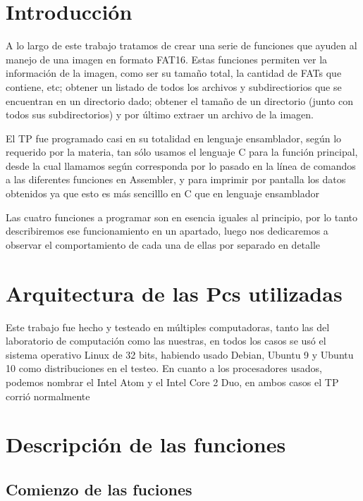 \documentclass[a4paper,10pt]{article}
\title{}
\author{}
\date{}
\begin{document}
\maketitle

\section{Introducción}

A lo largo de este trabajo tratamos de crear una serie de funciones que ayuden al manejo de una imagen en formato FAT16. Estas funciones permiten ver la información de la imagen, como ser su tamaño total, la cantidad de FATs que contiene, etc; obtener un listado de todos los archivos y subdirectiorios que se encuentran en un directorio dado; obtener el tamaño de un directorio (junto con todos sus subdirectorios) y por último extraer un archivo de la imagen.

El TP fue programado casi en su totalidad en lenguaje ensamblador, según lo requerido por la materia, tan sólo usamos el lenguaje C para la función principal, desde la cual llamamos según corresponda por lo pasado en la línea de comandos a las diferentes funciones en Assembler, y para imprimir por pantalla  los datos obtenidos ya que esto es más sencilllo en C que en lenguaje ensamblador

Las cuatro funciones a programar son en esencia iguales al principio, por lo tanto describiremos ese funcionamiento en un apartado, luego nos dedicaremos a observar el comportamiento de cada una de ellas por separado en detalle

\section{Arquitectura de las Pcs utilizadas}

Este trabajo fue hecho y testeado en múltiples computadoras, tanto las del laboratorio de computación como las nuestras, en todos los casos se usó el sistema operativo Linux de 32 bits, habiendo usado Debian, Ubuntu 9 y Ubuntu 10 como distribuciones en el testeo. En cuanto a los procesadores usados, podemos nombrar el Intel Atom y el Intel Core 2 Duo, en ambos casos el TP corrió normalmente

\section{Descripción de las funciones}

\subsection{Comienzo de las fuciones}
\end{document}
